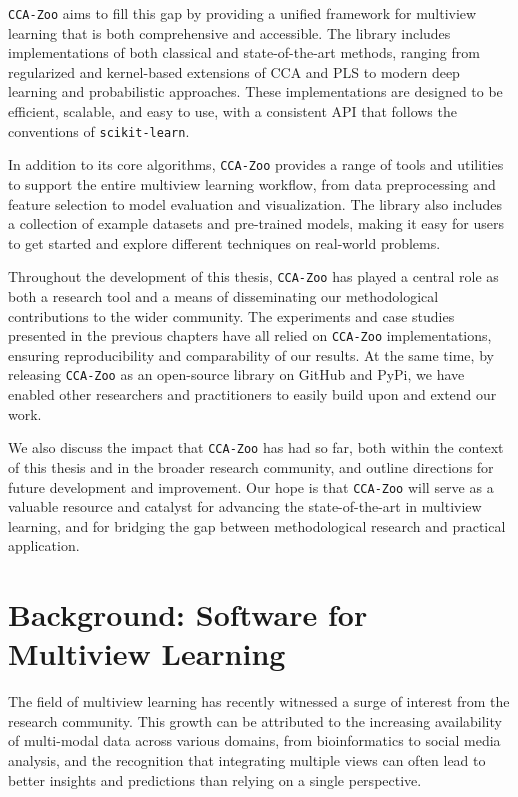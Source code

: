 \texttt{CCA-Zoo} aims to fill this gap by providing a unified framework for multiview learning that is both comprehensive and accessible. The library includes implementations of both classical and state-of-the-art methods, ranging from regularized and kernel-based extensions of CCA and PLS to modern deep learning and probabilistic approaches. These implementations are designed to be efficient, scalable, and easy to use, with a consistent API that follows the conventions of \texttt{scikit-learn}.

In addition to its core algorithms, \texttt{CCA-Zoo} provides a range of tools and utilities to support the entire multiview learning workflow, from data preprocessing and feature selection to model evaluation and visualization. The library also includes a collection of example datasets and pre-trained models, making it easy for users to get started and explore different techniques on real-world problems.

Throughout the development of this thesis, \texttt{CCA-Zoo} has played a central role as both a research tool and a means of disseminating our methodological contributions to the wider community. The experiments and case studies presented in the previous chapters have all relied on \texttt{CCA-Zoo} implementations, ensuring reproducibility and comparability of our results. At the same time, by releasing \texttt{CCA-Zoo} as an open-source library on GitHub and PyPi, we have enabled other researchers and practitioners to easily build upon and extend our work.

We also discuss the impact that \texttt{CCA-Zoo} has had so far, both within the context of this thesis and in the broader research community, and outline directions for future development and improvement. Our hope is that \texttt{CCA-Zoo} will serve as a valuable resource and catalyst for advancing the state-of-the-art in multiview learning, and for bridging the gap between methodological research and practical application.

\section{Background: Software for Multiview Learning}

The field of multiview learning has recently witnessed a surge of interest from the research community. This growth can be attributed to the increasing availability of multi-modal data across various domains, from bioinformatics to social media analysis, and the recognition that integrating multiple views can often lead to better insights and predictions than relying on a single perspective.

